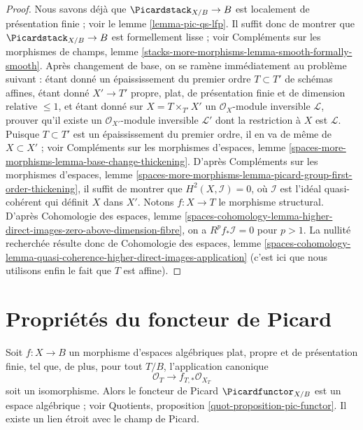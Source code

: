 \begin{proof}
Nous savons déjà que $\Picardstack_{X/B} \to B$ est localement de
présentation finie ; voir le lemme \ref{lemma-pic-qs-lfp}.
Il suffit donc de montrer que $\Picardstack_{X/B} \to B$ est formellement
lisse ; voir Compléments sur les morphismes de champs, lemme
\ref{stacks-more-morphisms-lemma-smooth-formally-smooth}.
Après changement de base, on se ramène immédiatement au problème suivant :
étant donné un épaississement du premier ordre $T \subset T'$ de schémas
affines, étant donné $X' \to T'$ propre, plat, de présentation finie et de
dimension relative $\leq 1$, et étant donné sur
$X = T \times_{T'} X'$ un $\mathcal{O}_X$-module inversible
$\mathcal{L}$, prouver qu'il existe un $\mathcal{O}_{X'}$-module inversible
$\mathcal{L}'$ dont la restriction à $X$ est $\mathcal{L}$.
Puisque $T \subset T'$ est un épaississement du premier ordre, il en va de
même de $X \subset X'$ ; voir Compléments sur les morphismes d'espaces,
lemme \ref{spaces-more-morphisms-lemma-base-change-thickening}.
D'après Compléments sur les morphismes d'espaces, lemme
\ref{spaces-more-morphisms-lemma-picard-group-first-order-thickening}, il
suffit de montrer que $H^2(X, \mathcal{I}) = 0$, où $\mathcal{I}$ est
l'idéal quasi-cohérent qui définit $X$ dans $X'$.
Notons $f : X \to T$ le morphisme structural.
D'après Cohomologie des espaces, lemme
\ref{spaces-cohomology-lemma-higher-direct-images-zero-above-dimension-fibre},
on a $R^pf_*\mathcal{I} = 0$ pour $p > 1$.
La nullité recherchée résulte donc de Cohomologie des espaces, lemme
\ref{spaces-cohomology-lemma-quasi-coherence-higher-direct-images-application}
(c'est ici que nous utilisons enfin le fait que $T$ est affine).
\end{proof}




\section{Propriétés du foncteur de Picard}
\label{section-picard-functor}

\noindent
Soit $f : X \to B$ un morphisme d'espaces algébriques plat, propre et de
présentation finie, tel que, de plus, pour tout $T/B$, l'application
canonique
$$
\mathcal{O}_T \longrightarrow f_{T, *}\mathcal{O}_{X_T}
$$
soit un isomorphisme. Alors le foncteur de Picard
$\Picardfunctor_{X/B}$ est un espace algébrique ; voir Quotients,
proposition \ref{quot-proposition-pic-functor}.
Il existe un lien étroit avec le champ de Picard.

